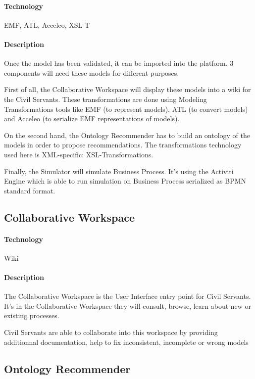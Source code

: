 \documentclass{learnpad}
\begin{document}
\paragraph{Technology}
EMF, ATL, Acceleo, XSL-T

\paragraph{Description}
Once the model has been validated, it can be imported into the \learnpad
platform.  3 components will need these models for different purposes.

First of all, the Collaborative Workspace will display these models into a wiki
for the Civil Servants.  These transformations are done using Modeling
Transformations tools like EMF (to represent models), ATL (to convert models)
and Acceleo (to serialize EMF representations of models).

On the second hand, the Ontology Recommender has to build an ontology of the
models in order to propose recommendations.  The transformations technology used
here is XML-specific: XSL-Transformations.

Finally, the Simulator will simulate Business Process.  It's using the Activiti
Engine which is able to run simulation on Business Process serialized as BPMN
standard format.

\subsection{Collaborative Workspace}
\label{sec:collaborative-workspace}

\paragraph{Technology}
Wiki

\paragraph{Description}
The Collaborative Workspace is the User Interface entry point for Civil
Servants.  It's in the Collaborative Workspace they will consult, browse, learn
about new or existing processes.

Civil Servants are able to collaborate into this workspace by providing
additionnal documentation, help to fix inconsistent, incomplete or wrong models

\subsection{Ontology Recommender}
\label{sec:ontology-recommender}
\end{document}
